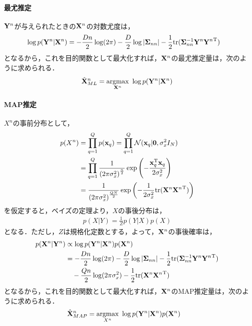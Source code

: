\documentclass[11pt,a4j]{jarticle}
\begin{document}
        \paragraph{最尤推定}
          ${\bf Y}^n$が与えられたときの${\bf X}^n$の対数尤度は，
          \begin{align}
            \log p({\bf Y}^n|{\bf X}^n)
            &= -\frac{Dn}{2} \log (2 \pi) - \frac{D}{2} \log |{\bf \Sigma}_{nn}| - \frac{1}{2} {\rm tr} ({\bf \Sigma}_{nn}^{-1} {{\bf Y}^n}{{\bf Y}^n}^{\mathrm{T}})
          \end{align}
          となるから，これを目的関数として最大化すれば，${\bf X}^n$の最尤推定量は，次のように求められる．
          \begin{align}
            \hat{\bf X}^{n}_{ML} &= \underset{{\bf X}^n}{\rm argmax} ~ \log p( {\bf Y}^n | {\bf X}^n) \\
          \end{align}

        \paragraph{MAP推定}
          $X^n$の事前分布として，
          \begin{align}
            p(X^n) 
            &= \prod_{q=1}^{Q} p({\bf x}_q) = \prod_{q=1}^{Q} \mathcal{N}({\bf x}_q | {\bf 0}, \sigma_x^2 I_N) \\
            &= \prod_{q=1}^{Q} \frac{1}{{(2 \pi {\sigma_x^2} )}^{\frac{n}{2}}} \exp \left( - \frac{ {\bf x}_q^{\mathrm{T}} {\bf x}_q }{2 \sigma_x^2} \right) \\
            &= \frac{1}{{(2 \pi {\sigma_x^2} )}^{\frac{QN}{2}}} \exp \left( -\frac{1}{2 \sigma_x^2} {\rm tr} ({{\bf X}^n}{{\bf X}^n}^{\mathrm{T}}) \right) \\
          \end{align}
          を仮定すると，ベイズの定理より，$X$の事後分布は，
          \begin{align}
            p(X|Y) = \frac{1}{Z} p(Y|X)p(X)
          \end{align}
          となる．ただし，$Z$は規格化定数とする，よって，${\bf X}^n$の事後確率は，
          \begin{align}
            p({\bf X}^n|{\bf Y}^n) 
            &\propto \log p({\bf Y}^n | {\bf X}^n) p({\bf X}^n) \\
            &= -\frac{Dn}{2} \log (2 \pi) - \frac{D}{2} \log |{\bf \Sigma}_{nn}| - \frac{1}{2} {\rm tr} ({\bf \Sigma}_{nn}^{-1} {{\bf Y}^n}{{\bf Y}^n}^{\mathrm{T}}) \\
            &\hspace{1em} -\frac{Qn}{2} \log (2 \pi \sigma_x^2) - \frac{1}{2} {\rm tr} ({{\bf X}^n}{{\bf X}^n}^{\mathrm{T}})
          \end{align}
          となるから，これを目的関数として最大化すれば，${\bf X}^n$のMAP推定量は，次のように求められる．
          \begin{align}
            \hat{\bf X}^{n}_{MAP} &= \underset{X^n}{\rm argmax} ~ \log p({\bf Y}^n | {\bf X}^n) p({\bf X}^n) 
          \end{align}
\end{document}
